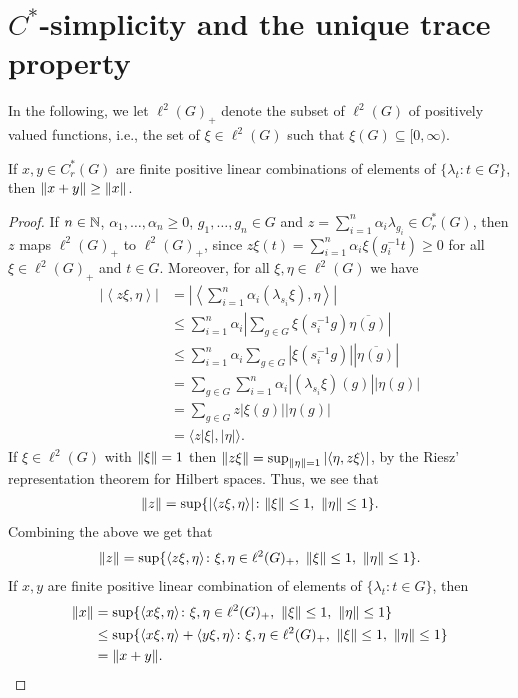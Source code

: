 \section{$C^*$-simplicity and the unique trace property}
In the following, we let $\ell^2(G)_+$ denote the subset of $\ell^2(G)$ of positively valued functions, i.e., the set of $\xi\in \ell^2(G)$ such that $\xi(G) \subseteq [0,\infty)$.
\begin{lemma}\label{4.1 x+y geq x}
If $x,y \in C_r^*(G)$ are finite positive linear combinations of elements of $\{ \lambda_t \colon t \in G \}$, then $\lVert x+y\rVert \geq \lVert x \rVert$.
\begin{proof}
If $n \in \mathbb{N}$, $\alpha_1,\dots, \alpha_n \geq 0$, $g_1 , \dots , g_n \in G$ and $z=\sum_{i=1}^n \alpha_{i} \lambda_{g_i} \in C_r^*(G)$, then $z$ maps $\ell^2(G)_+$ to $\ell^2(G)_+$, since $z \xi(t)=\sum_{i=1}^n \alpha_i \xi(g_{i}^{-1} t) \geq 0$ for all $\xi \in \ell^2(G)_+$ and $t \in G$. Moreover, for all $\xi, \eta \in \ell^2(G)$ we have
\begin{align*}
\left| \left\langle z \xi , \eta \right\rangle \right| &= \left| \left\langle \sum_{i = 1}^n \alpha_i (\lambda_{s_i} \xi) , \eta \right\rangle \right|\\
&\leq \sum_{i=1}^n \alpha_i \left| \sum_{g \in G} \xi(s_{i}^{-1}g) \overline{\eta(g)} \right|\\
&\leq \sum_{i=1}^n \alpha_i  \sum_{g \in G} |\xi(s_{i}^{-1}g)| |\overline{\eta(g)}| \\
&= \sum_{g \in G} \sum_{i=1}^n \alpha_i |(\lambda_{s_i}\xi)(g)| |\eta(g)|\\
&= \sum_{g \in G} z |\xi(g)| |\eta(g)|\\
&=\langle z |\xi|, |\eta|\rangle.
\end{align*}
If $\xi \in \ell^2(G)$ with $\lVert \xi \rVert = 1$ then $\lVert z \xi \rVert = \sup_{\lVert \eta \rVert = 1} |\langle \eta , z \xi\rangle|$, by the Riesz' representation theorem for Hilbert spaces. Thus, we see that 
\begin{align*}
\lVert z \rVert = \sup \{ | \langle z \xi , \eta \rangle| \colon \lVert \xi \rVert \leq 1, \ \lVert \eta \rVert \leq 1 \}.
\end{align*} 
Combining the above we get that
\begin{align*}
\lVert z \rVert = \sup \{ \langle z \xi , \eta \rangle  \colon \xi, \eta \in \ell^2(G)_+, \ \lVert \xi \rVert \leq 1  , \ \lVert \eta \rVert \leq 1 \}.
\end{align*} 
If $x,y$ are finite positive linear combination of elements of $\{ \lambda_t \colon t \in G \}$, then  
\begin{align*}
\lVert x \rVert &= \sup \{ \langle x \xi , \eta \rangle  \colon \xi, \eta \in \ell^2(G)_+, \ \lVert \xi \rVert \leq 1  , \ \lVert \eta \rVert \leq 1 \} \\
&\leq \sup \{ \langle x \xi , \eta \rangle + \langle y \xi, \eta \rangle \colon \xi, \eta \in \ell^2(G)_+, \ \lVert \xi \rVert \leq 1  , \ \lVert \eta \rVert \leq 1 \}\\
&=\lVert x + y \rVert.
\end{align*}
\end{proof}
\end{lemma}

